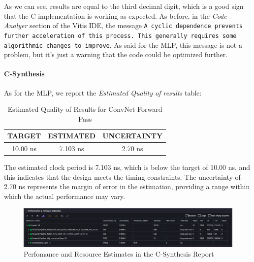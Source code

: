 \documentclass{article}
\begin{document}
As we can see, results are equal to the third decimal digit, which is a good sign that the C implementation is working as expected. As before, in the \textit{Code Analyer} section of the Vitis IDE, the message \texttt{A cyclic dependence prevents further acceleration of this process. This generally requires some algorithmic changes to improve}. As said for the MLP, this message is not a problem, but it's just a warning that the code could be optimized further.

\paragraph{C-Synthesis}
As for the MLP, we report the \textit{Estimated Quality of results} table:

\begin{table}[H]
    \centering
    \begin{tabular}{|c|c|c|}
        \hline
        \textbf{TARGET} & \textbf{ESTIMATED} & \textbf{UNCERTAINTY} \\
        \hline
        10.00 ns & 7.103 ns & 2.70 ns \\
        \hline
    \end{tabular}
    \caption{\centering Estimated Quality of Results for ConvNet Forward Pass}
    \label{tab:convnet-quality}
\end{table}

The estimated clock period is 7.103 ns, which is below the target of 10.00 ns, and this indicates that the design meets the timing constraints. The uncertainty of 2.70 ns represents the margin of error in the estimation, providing a range within which the actual performance may vary.

\begin{figure}[H]
    \centering
    \includegraphics[width=1\textwidth]{./assets/ConvNet/c-synthesis-performanceandresourceestimates.png}
    \caption{Perfomance and Resource Estimates in the C-Synthesis Report}
    \label{fig:convnet-c-synthesis-performance-resources}
\end{figure}
\end{document}
